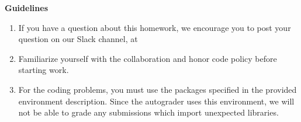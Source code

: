 {\bf Guidelines}
\begin{enumerate}[itemsep=2pt]
    \item If you have a question about this homework, we encourage you to post your question on our Slack channel, at \slack
    \item Familiarize yourself with the collaboration and honor code policy before starting work.
    \item For the coding problems, you must use the packages specified in the provided environment description.  Since the autograder uses this environment, we will not be able to grade any submissions which import unexpected libraries.
\end{enumerate}